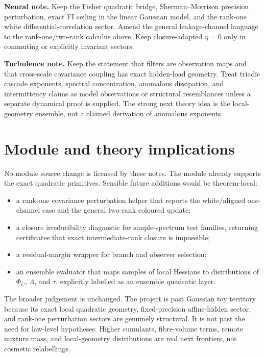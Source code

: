 \documentclass[11pt,a4paper]{article}
\numberwithin{equation}{section}
\theoremstyle{thmcompact}
\theoremstyle{remark}
\begin{document}
\textbf{Neural note.} Keep the Fisher quadratic bridge, Sherman--Morrison
precision perturbation, exact FI ceiling in the linear Gaussian model, and the
rank-one white differential-correlation sector. Amend the general leakage-channel
language to the rank-one/two-rank calculus above. Keep closure-adapted
\(\eta=0\) only in commuting or explicitly invariant sectors.

\textbf{Turbulence note.} Keep the statement that filters are observation maps
and that cross-scale covariance coupling has exact hidden-load geometry. Treat
triadic cascade exponents, spectral concentration, anomalous dissipation, and
intermittency claims as model observations or structural resemblances unless a
separate dynamical proof is supplied. The strong next theory idea is the
local-geometry ensemble, not a claimed derivation of anomalous exponents.

\section{Module and theory implications}

No module source change is licensed by these notes. The module already supports
the exact quadratic primitives. Sensible future additions would be theorem-local:

\begin{itemize}
\item a rank-one covariance perturbation helper that reports the white/aligned
one-channel case and the general two-rank coloured update;
\item a closure irreducibility diagnostic for simple-spectrum test families,
returning certificates that exact intermediate-rank closure is impossible;
\item a residual-margin wrapper for branch and observer selection;
\item an ensemble evaluator that maps samples of local Hessians to distributions
of \(\Phi_C\), \(\Lambda\), and \(\tau\), explicitly labelled as an ensemble
quadratic layer.
\end{itemize}

The broader judgement is unchanged. The project is past Gaussian toy territory
because its exact local quadratic geometry, fixed-precision affine-hidden sector,
and rank-one perturbation sectors are genuinely structural. It is not past the
need for law-level hypotheses. Higher cumulants, fibre-volume terms, remote
mixture mass, and local-geometry distributions are real next frontiers, not
cosmetic relabellings.
\end{document}
